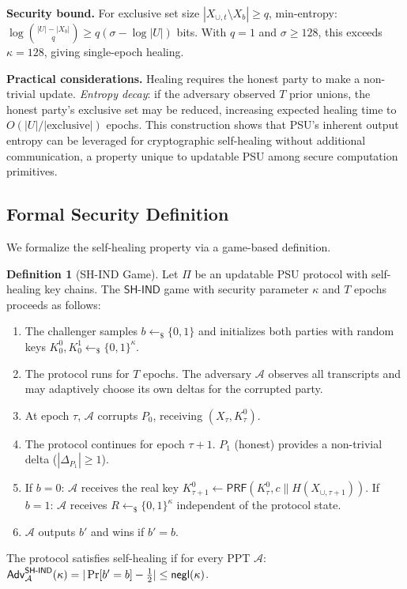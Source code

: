 \documentclass[letterpaper,twocolumn,10pt]{article}
\theoremstyle{definition}
\newtheorem{definition}[theorem]{Definition}
\newcommand{\cA}{\mathcal{A}}\newcommand{\cB}{\mathcal{B}}\newcommand{\cZ}{\mathcal{Z}}
\newcommand{\PRF}{\mathsf{PRF}}\newcommand{\ChaCha}{\mathsf{ChaCha20}}
\newcommand{\sample}{\leftarrow_{\$}}\newcommand{\concat}{\|}
\begin{document}
\textbf{Security bound.}
For exclusive set size $|X_{\cup,t} \setminus X_b| \geq q$, min-entropy:
$\log\binom{|U|-|X_b|}{q} \geq q(\sigma - \log|U|)$ bits. With $q = 1$ and
$\sigma \geq 128$, this exceeds $\kappa = 128$, giving single-epoch healing.

\textbf{Practical considerations.}
Healing requires the honest party to make a non-trivial update. \emph{Entropy
decay}: if the adversary observed $T$ prior unions, the honest party's
exclusive set may be reduced, increasing expected healing time to
$O(|U|/|\text{exclusive}|)$ epochs. This construction shows that PSU's
inherent output entropy can be leveraged for cryptographic self-healing
without additional communication, a property unique to updatable PSU among
secure computation primitives.

\subsection{Formal Security Definition}

We formalize the self-healing property via a game-based definition.

\begin{definition}[SH-IND Game]
Let $\Pi$ be an updatable PSU protocol with self-healing key chains. The
$\mathsf{SH\text{-}IND}$ game with security parameter $\kappa$ and $T$
epochs proceeds as follows:
\begin{enumerate}
\item The challenger samples $b \sample \{0,1\}$ and initializes both
parties with random keys $K^0_0, K^1_0 \sample \{0,1\}^\kappa$.
\item The protocol runs for $T$ epochs. The adversary $\cA$ observes all
transcripts and may adaptively choose its own deltas for the corrupted
party.
\item At epoch $\tau$, $\cA$ corrupts $P_0$, receiving
$(X_\tau, K^0_\tau)$.
\item The protocol continues for epoch $\tau+1$. $P_1$ (honest) provides
a non-trivial delta ($|\Delta_{P_1}| \geq 1$).
\item If $b = 0$: $\cA$ receives the real key $K^0_{\tau+1} \leftarrow
\PRF(K^0_\tau, c \concat H(X_{\cup,\tau+1}))$. If $b = 1$: $\cA$
receives $R \sample \{0,1\}^\kappa$ independent of the protocol state.
\item $\cA$ outputs $b'$ and wins if $b' = b$.
\end{enumerate}
The protocol satisfies self-healing if for every PPT $\cA$:
$\mathsf{Adv}^{\mathsf{SH\text{-}IND}}_\cA(\kappa) = |\Pr[b'=b] -
\tfrac{1}{2}| \leq \negl(\kappa)$.
\end{definition}
\end{document}
